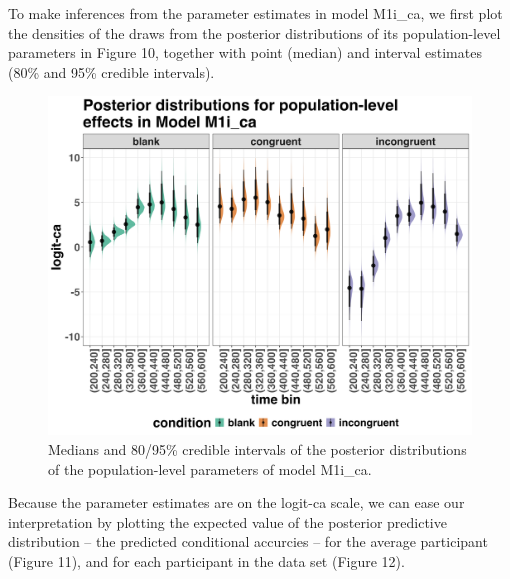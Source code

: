\documentclass[
  man, donotrepeattitle,floatsintext]{apa6}
\begin{document}
To make inferences from the parameter estimates in model M1i\_ca, we first plot the densities of the draws from the posterior distributions of its population-level parameters in Figure 10, together with point (median) and interval estimates (80\% and 95\% credible intervals).



\begin{figure}[H]

{\centering \includegraphics[width=0.8\linewidth,height=0.67\textheight,]{../Tutorial_2_Bayesian/figures/M1i_ca_postdistr} 

}

\caption{Medians and 80/95\% credible intervals of the posterior distributions of the population-level parameters of model M1i\_ca.}\label{fig:plot-ca-fixed-effects}
\end{figure}

Because the parameter estimates are on the logit-ca scale, we can ease our interpretation by plotting the expected value of the posterior predictive distribution -- the predicted conditional accurcies -- for the average participant (Figure 11), and for each participant in the data set (Figure 12).
\end{document}

